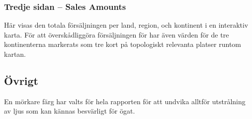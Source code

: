 \documentclass[10pt]{article}
\begin{document}
\subsubsection{Tredje sidan -- Sales Amounts}

Här visas den totala försäljningen per land, region, och kontinent i en interaktiv karta. För att överskådliggöra försäljningen för har även värden för de tre kontinenterna markerats som tre kort på topologiskt relevanta platser runtom kartan.

\subsection{Övrigt}

En mörkare färg har valts för hela rapporten för att undvika alltför utstrålning av ljus som kan kännas besvärligt för ögat.
\end{document}

